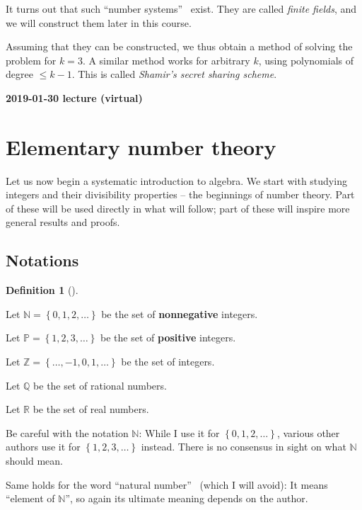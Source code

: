 \documentclass[numbers=enddot,12pt,final,onecolumn,notitlepage]{scrartcl}%
\numberwithin{exer}{subsection}
\theoremstyle{definition}
\newtheorem{defi}[theo]{Definition}
\newenvironment{definition}[1][]
{\begin{defi}[#1]\begin{leftbar}}
{\end{leftbar}\end{defi}}
\begin{document}
It turns out that such \textquotedblleft number systems\textquotedblright%
\ exist. They are called \textit{finite fields}, and we will construct them
later in this course.

Assuming that they can be constructed, we thus obtain a method of solving the
problem for $k=3$. A similar method works for arbitrary $k$, using polynomials
of degree $\leq k-1$. This is called \textit{Shamir's secret sharing scheme}.

\begin{center}
\textbf{2019-01-30 lecture (virtual)}
\end{center}

\section{Elementary number theory}

Let us now begin a systematic introduction to algebra. We start with studying
integers and their divisibility properties -- the beginnings of number theory.
Part of these will be used directly in what will follow; part of these will
inspire more general results and proofs.

\subsection{Notations}

\begin{definition}
Let $\mathbb{N}=\left\{  0,1,2,\ldots\right\}  $ be the set of
\textbf{nonnegative} integers.

Let $\mathbb{P}=\left\{  1,2,3,\ldots\right\}  $ be the set of
\textbf{positive} integers.

Let $\mathbb{Z}=\left\{  \ldots,-1,0,1,\ldots\right\}  $ be the set of integers.

Let $\mathbb{Q}$ be the set of rational numbers.

Let $\mathbb{R}$ be the set of real numbers.
\end{definition}

Be careful with the notation $\mathbb{N}$: While I use it for $\left\{
0,1,2,\ldots\right\}  $, various other authors use it for $\left\{
1,2,3,\ldots\right\}  $ instead. There is no consensus in sight on what
$\mathbb{N}$ should mean.

Same holds for the word \textquotedblleft natural number\textquotedblright%
\ (which I will avoid): It means \textquotedblleft element of $\mathbb{N}%
$\textquotedblright, so again its ultimate meaning depends on the author.
\end{document}
